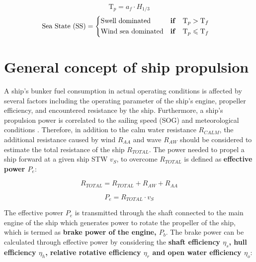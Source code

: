 \begin{equation}\label{eqn:T_p_spectralpeak}
    \text{T}_p = a_f\cdot H_{1/3}
\end{equation}
\begin{equation}
    \label{eqn:H_s_and_Tp}
    \text{Sea State (SS)} = 
    \begin{cases}
        \begin{aligned}
            &\text{Swell dominated}  &&\text{\textbf{if}} \quad \text{T}_p > \text{T}_f \\ 
            &\text{Wind sea dominated} && \text{\textbf{if}} \quad \text{T}_p \leqslant \text{T}_f 
        \end{aligned}     
    \end{cases} 
\end{equation}

\pagebreak

\section{General concept of ship propulsion}\label{sec:power_calc}

A ship's bunker fuel consumption in actual operating conditions is affected by several factors including the operating parameter of the ship's engine, propeller efficiency, and encountered resistance by the ship. Furthermore, a ship's propulsion power is correlated to the sailing speed (SOG) and meteorological conditions . Therefore, in addition to the calm water resistance $R_{CALM}$, the additional resistance caused by wind $R_{AA}$ and wave $R_{AW}$ should be considered to estimate the total resistance of the ship $R_{TOTAL}$. The power needed to propel a ship forward at a given ship STW $v_S$, to overcome $R_{TOTAL}$ is defined as \textbf{effective power $P_e$}:

\begin{equation}\label{eqn:R_tot}
    R_{TOTAL} = R_{TOTAL} + R_{AW} + R_{AA} 
\end{equation}

\begin{equation}\label{eqn:P_e}
    P_e = R_{TOTAL}\cdot v_{S}
\end{equation}

The effective power $P_e$ is transmitted through the shaft connected to the main engine of the ship which generates power to rotate the propeller of the ship, which is termed as \textbf{brake power of the engine, $P_b$}. The brake power can be calculated through effective power by considering the \textbf{shaft efficiency $\eta_s$, hull efficiency $\eta_h$, relative rotative efficiency $\eta_r$ and open water efficiency $\eta_o$}:

